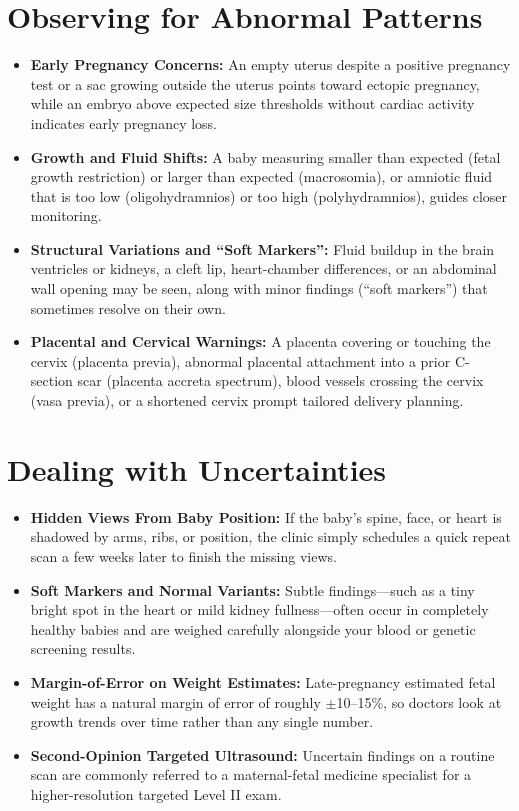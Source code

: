 \section{Observing for Abnormal Patterns}
\begin{itemize}
\item \textbf{Early Pregnancy Concerns:} An empty uterus despite a positive pregnancy test or a sac growing outside the uterus points toward ectopic pregnancy, while an embryo above expected size thresholds without cardiac activity indicates early pregnancy loss.
\item \textbf{Growth and Fluid Shifts:} A baby measuring smaller than expected (fetal growth restriction) or larger than expected (macrosomia), or amniotic fluid that is too low (oligohydramnios) or too high (polyhydramnios), guides closer monitoring.
\item \textbf{Structural Variations and ``Soft Markers'':} Fluid buildup in the brain ventricles or kidneys, a cleft lip, heart-chamber differences, or an abdominal wall opening may be seen, along with minor findings (``soft markers'') that sometimes resolve on their own.
\item \textbf{Placental and Cervical Warnings:} A placenta covering or touching the cervix (placenta previa), abnormal placental attachment into a prior C-section scar (placenta accreta spectrum), blood vessels crossing the cervix (vasa previa), or a shortened cervix prompt tailored delivery planning.
\end{itemize}

\section{Dealing with Uncertainties}
\begin{itemize}
\item \textbf{Hidden Views From Baby Position:} If the baby's spine, face, or heart is shadowed by arms, ribs, or position, the clinic simply schedules a quick repeat scan a few weeks later to finish the missing views.
\item \textbf{Soft Markers and Normal Variants:} Subtle findings---such as a tiny bright spot in the heart or mild kidney fullness---often occur in completely healthy babies and are weighed carefully alongside your blood or genetic screening results.
\item \textbf{Margin-of-Error on Weight Estimates:} Late-pregnancy estimated fetal weight has a natural margin of error of roughly $\pm$10--15\%, so doctors look at growth trends over time rather than any single number.
\item \textbf{Second-Opinion Targeted Ultrasound:} Uncertain findings on a routine scan are commonly referred to a maternal-fetal medicine specialist for a higher-resolution targeted Level II exam.
\end{itemize}

